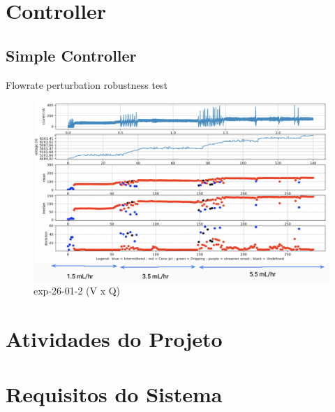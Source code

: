 \section{Controller}
\label{sec:controller_results}


\subsection{Simple Controller}

Flowrate perturbation robustness test

\begin{figure}[H]
    \center
    \includegraphics[width=18cm]{Figuras/19:03/control_first_results.png}
    \caption{ exp-26-01-2 (V x Q)}
\end{figure}


\section{Atividades do Projeto}
\label{metodo3}

\section {Requisitos do Sistema}
\label{req}


\clearpage